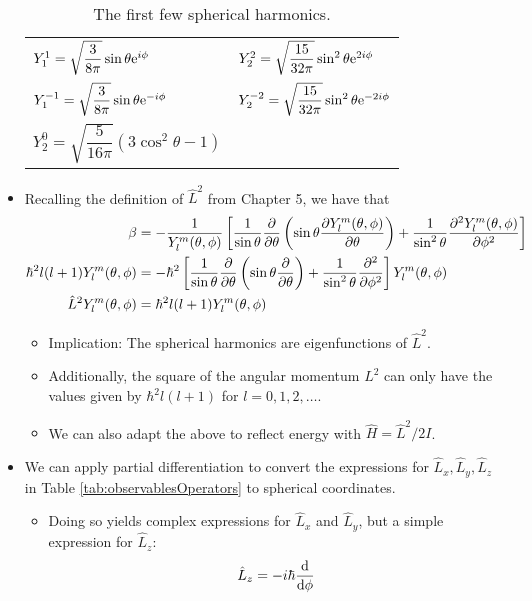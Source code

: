 \documentclass[../notes.tex]{subfiles}
\begin{document}
\begin{itemize}
\begin{table}[h!]
\begin{tabular}{ll}
            $Y_1^1=\sqrt{\dfrac{3}{8\pi}}\sin\theta\e[i\phi]$ & $Y_2^2=\sqrt{\dfrac{15}{32\pi}}\sin^2\theta\e[2i\phi]$\\
            $Y_1^{-1}=\sqrt{\dfrac{3}{8\pi}}\sin\theta\e[-i\phi]$ & $Y_2^{-2}=\sqrt{\dfrac{15}{32\pi}}\sin^2\theta\e[-2i\phi]$\\
            $Y_2^0=\sqrt{\dfrac{5}{16\pi}}(3\cos^2\theta-1)$ & \\
            \bottomrule
        \end{tabular}
        \caption{The first few spherical harmonics.}
        \label{tab:sphericalHarmonics}
    \end{table}
    \item {}Recalling the definition of $\hat{L}^2$ from Chapter 5, we have that
    \begin{align*}
        \beta &= -\frac{1}{Y_l^m(\theta,\phi)}\left[ \frac{1}{\sin\theta}\pdv{\theta}\left( \sin\theta\pdv{Y_l^m(\theta,\phi)}{\theta} \right)+\frac{1}{\sin^2\theta}\pdv[2]{Y_l^m(\theta,\phi)}{\phi} \right]\\
        \hbar^2l(l+1)Y_l^m(\theta,\phi) &= -\hbar^2\left[ \frac{1}{\sin\theta}\pdv{\theta}\left( \sin\theta\pdv{\theta} \right)+\frac{1}{\sin^2\theta}\pdv[2]{\phi} \right]Y_l^m(\theta,\phi)\\
        \hat{L}^2Y_l^m(\theta,\phi) &= \hbar^2l(l+1)Y_l^m(\theta,\phi)
    \end{align*}
    \begin{itemize}
        \item Implication: The spherical harmonics are eigenfunctions of $\hat{L}^2$.
        \item Additionally, the square of the angular momentum $L^2$ can only have the values given by $\hbar^2l(l+1)$ for $l=0,1,2,\dots$.
        \item We can also adapt the above to reflect energy with $\hat{H}=\hat{L}^2/2I$.
    \end{itemize}
    \item {}We can apply partial differentiation to convert the expressions for $\hat{L}_x,\hat{L}_y,\hat{L}_z$ in Table \ref{tab:observablesOperators} to spherical coordinates.
    \begin{itemize}
        \item Doing so yields complex expressions for $\hat{L}_x$ and $\hat{L}_y$, but a simple expression for $\hat{L}_z$:
        \begin{equation*}
            \hat{L}_z = -i\hbar\dv{\phi}
        \end{equation*}

\end{itemize}
\end{itemize}
\end{document}
